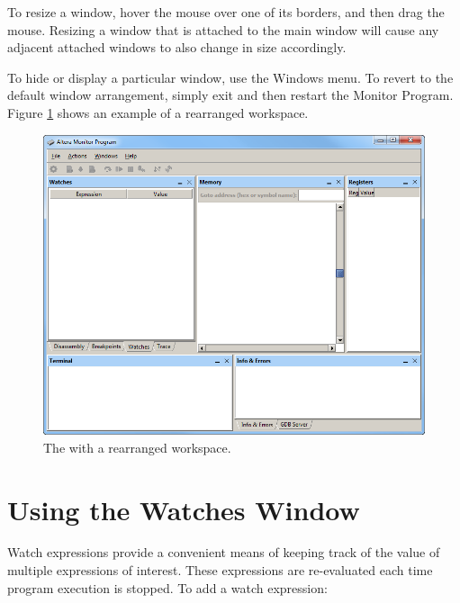 \documentclass[11pt, twoside, pdftex]{article}
\begin{document}
To resize a window, hover the mouse over one of its borders, and
then drag the mouse. Resizing a window that is attached to the
main window will cause any adjacent attached windows to also
change in size accordingly.

To hide or display a particular window, use the {\sf Windows}
menu. To revert to the default window arrangement, simply exit
and then restart the Monitor Program. Figure \ref{fig:AMP_rearrangedworkspace} shows an example
of a rearranged workspace.

\begin{figure}[H]
   \begin{center}
      \includegraphics[scale=0.6]{screenshots/figure59.png}
   \end{center}
   \caption{The \productNameMed{} with a rearranged workspace.} 
   \label{fig:AMP_rearrangedworkspace}
\end{figure}


\section{Using the Watches Window}

Watch expressions provide a convenient means of keeping track of
the value of multiple expressions of interest. These expressions
are re-evaluated each time program execution is stopped. 
To add a watch expression:
\end{document}
